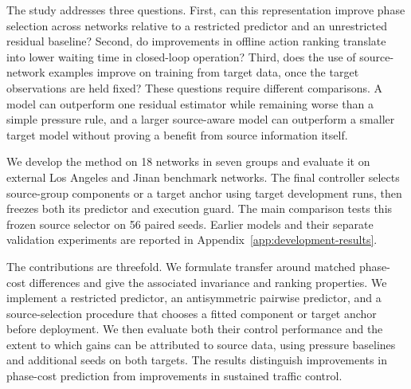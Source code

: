 The study addresses three questions. First, can this representation improve phase selection across networks relative to a restricted predictor and an unrestricted residual baseline? Second, do improvements in offline action ranking translate into lower waiting time in closed-loop operation? Third, does the use of source-network examples improve on training from target data, once the target observations are held fixed? These questions require different comparisons. A model can outperform one residual estimator while remaining worse than a simple pressure rule, and a larger source-aware model can outperform a smaller target model without proving a benefit from source information itself.

We develop the method on 18 networks in seven groups and evaluate it on external Los Angeles and Jinan benchmark networks. The final controller selects source-group components or a target anchor using target development runs, then freezes both its predictor and execution guard. The main comparison tests this frozen source selector on 56 paired seeds. Earlier models and their separate validation experiments are reported in Appendix~\ref{app:development-results}.

The contributions are threefold. We formulate transfer around matched phase-cost differences and give the associated invariance and ranking properties. We implement a restricted predictor, an antisymmetric pairwise predictor, and a source-selection procedure that chooses a fitted component or target anchor before deployment. We then evaluate both their control performance and the extent to which gains can be attributed to source data, using pressure baselines and additional seeds on both targets. The results distinguish improvements in phase-cost prediction from improvements in sustained traffic control.
